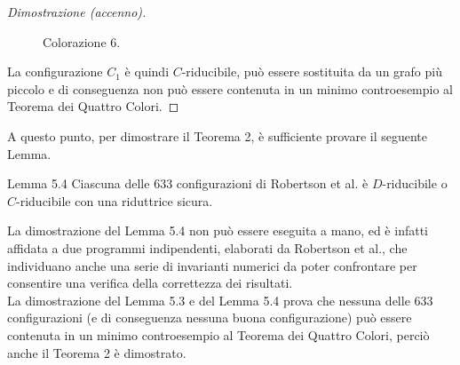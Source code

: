 \documentclass[a4paper,12pt,titlepage]{report}
\begin{document}
\begin{proof}[Dimostrazione (accenno)]
\begin{figure}[H]
    			\caption{Colorazione 6.}
    		\end{figure}
    		La configurazione $C_1$ è quindi $\mathit{C}$-riducibile, può essere sostituita da un grafo più piccolo e di conseguenza non può essere contenuta in un minimo controesempio al Teorema dei Quattro Colori. 
    \end{proof}
    
    A questo punto, per dimostrare il Teorema 2, è sufficiente provare il seguente Lemma.
    \begin{namedthm*}{Lemma 5.4}
    	Ciascuna delle 633 configurazioni di Robertson et al. è $\mathit{D}$-riducibile o $\mathit{C}$-riducibile con una riduttrice sicura.
    \end{namedthm*}
    \noindent La dimostrazione del Lemma 5.4 non può essere eseguita a mano, ed è infatti affidata a due programmi indipendenti, elaborati da Robertson et al., che individuano anche una serie di invarianti numerici da poter confrontare per consentire una verifica della correttezza dei risultati.
    \\La dimostrazione del Lemma 5.3 e del Lemma 5.4 prova che nessuna delle 633 configurazioni (e di conseguenza nessuna buona configurazione) può essere contenuta in un minimo controesempio al Teorema dei Quattro Colori, perciò anche il Teorema 2 è dimostrato.
   
\end{document}

